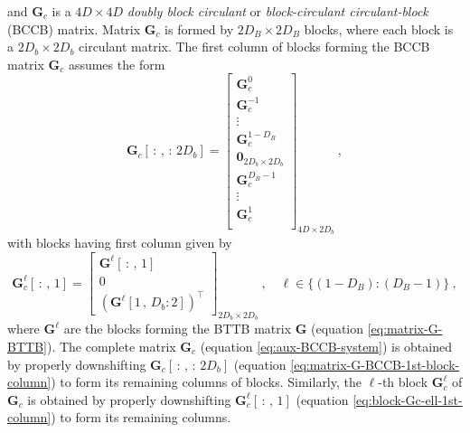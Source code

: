 and $\mathbf{G}_{c}$ is a $4D \times 4D$ \textit{doubly block circulant} \cite[][p. 28]{jain1989} or 
\textit{block-circulant circulant-block} (BCCB) \cite[][p. 76]{chan-jin2007} matrix.
Matrix $\mathbf{G}_{c}$ is formed by $2D_{B} \times 2D_{B}$ blocks, where each block is a 
$2D_{b} \times 2D_{b}$ circulant matrix.
The first column of blocks forming the BCCB matrix $\mathbf{G}_{c}$ assumes the form
\begin{equation}
	\mathbf{G}_{c}[ \, : \, , \, : \, 2D_{b}] = \begin{bmatrix}
		\mathbf{G}_{c}^{0} \\
		\mathbf{G}_{c}^{-1} \\
		\vdots \\
		\mathbf{G}_{c}^{1-D_{B}} \\
		\mathbf{0}_{2D_{b} \times 2D_{b}} \\
		\mathbf{G}_{c}^{D_{B}-1} \\
		\vdots \\
		\mathbf{G}_{c}^{1} \\
	\end{bmatrix}_{4D \times 2D_{b}} \: ,
	\label{eq:matrix-G-BCCB-1st-block-column}
\end{equation}
with blocks having first column given by
\begin{equation}
	\mathbf{G}_{c}^{\ell}[ \, : \, , \, 1] = \begin{bmatrix}
		\mathbf{G}^{\ell}[ \, : \, , \, 1] \\ 0 \\ \left( \mathbf{G}^{\ell}[ 1 \, , \, D_{b}:2] \right)^{\top}
	\end{bmatrix}_{2D_{b} \times 2D_{b}} \: , \quad \ell \in \{(1-D_{B}):(D_{B}-1)\} \: ,
	\label{eq:block-Gc-ell-1st-column}
\end{equation}
where $\mathbf{G}^{\ell}$ are the blocks forming the BTTB matrix $\mathbf{G}$ (equation \ref{eq:matrix-G-BTTB}).
The complete matrix $\mathbf{G}_{c}$ (equation \ref{eq:aux-BCCB-system}) is obtained by properly downshifting 
$\mathbf{G}_{c}[ \, : \, , \, : \, 2D_{b}]$ (equation \ref{eq:matrix-G-BCCB-1st-block-column}) to
form its remaining columns of blocks.
Similarly, the $\ell$-th block $\mathbf{G}_{c}^{\ell}$ of $\mathbf{G}_{c}$ is obtained by properly
downshifting $\mathbf{G}_{c}^{\ell}[ \, : \, , \, 1]$ (equation \ref{eq:block-Gc-ell-1st-column}) to form its remaining columns.

